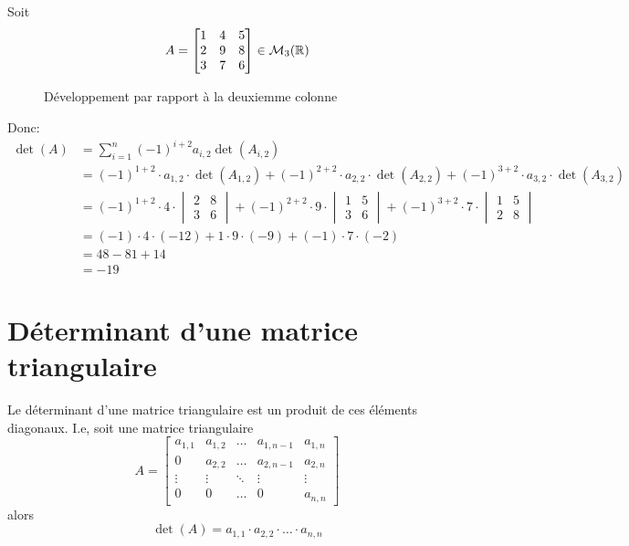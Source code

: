\begin{eg}
   Soit  
   \[
   A = 
   \begin{bmatrix} 
       1 & 4 & 5\\
       2 & 9 & 8\\
       3 & 7 & 6
   \end{bmatrix} \in \mathcal{M}_3(\mathbb{R})
   \] 

\begin{figure}[H]
    \centering
    \caption{Développement par rapport à la deuxiemme colonne}
    \label{fig:mat-colonne-2}
\end{figure}
Donc:
\begin{align*}
    \det(A) &= \sum_{i=1}^{n} (-1)^{i + 2} a_{i, 2} \det(A_{i, 2}) \\
            &= (-1)^{1 + 2} \cdot a_{1, 2} \cdot \det(A_{1, 2}) + (-1)^{2 + 2} \cdot a_{2, 2} \cdot \det(A_{2,2})  + (-1)^{3 + 2} \cdot a_{3, 2} \cdot \det(A_{3, 2}) \\
            &= (-1)^{1 + 2} \cdot 4 \cdot \begin{vmatrix} 2 & 8 \\ 3 & 6 \end{vmatrix} + (-1)^{2 + 2} \cdot 9 \cdot \begin{vmatrix} 1 & 5 \\ 3 & 6 \end{vmatrix}  + (-1)^{3 + 2} \cdot 7 \cdot \begin{vmatrix} 1 & 5 \\ 2 & 8 \end{vmatrix} \\
            &= (-1) \cdot 4 \cdot (-12) + 1 \cdot 9 \cdot (-9) + (-1) \cdot 7 \cdot (-2)\\
            &= 48 - 81 + 14\\
            &= -19
\end{align*}
\end{eg}

\section{Déterminant d'une matrice triangulaire}
\begin{corollary}
   Le déterminant d'une matrice triangulaire est un produit de ces éléments diagonaux. I.e, soit une matrice triangulaire
   \[
   A = \begin{bmatrix} 
       a_{1, 1} & a_{1, 2} & \ldots & a_{1, n-1} & a_{1, n}\\
       0        & a_{2, 2} & \ldots & a_{2, n-1} & a_{2, n}\\
       \vdots   & \vdots   & \ddots & \vdots     & \vdots  \\
       0        & 0        & \ldots & 0          & a_{n, n}
   \end{bmatrix} 
   \] 
   alors 
   \[
   \det(A) = a_{1,1} \cdot a_{2,2} \cdot \ldots \cdot a_{n,n}
   \] 
\end{corollary}

